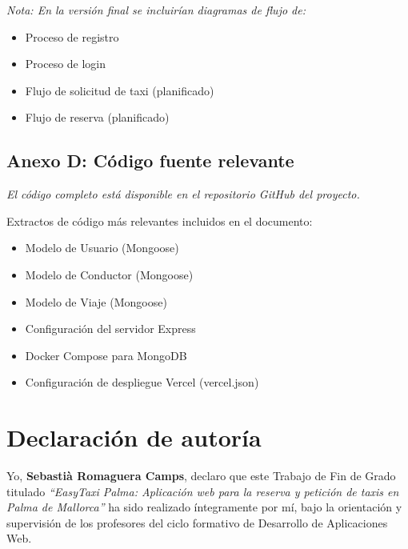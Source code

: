 \documentclass[12pt,a4paper]{article}
\begin{document}
\textit{Nota: En la versión final se incluirían diagramas de flujo de:}
\begin{itemize}
    \item Proceso de registro
    \item Proceso de login
    \item Flujo de solicitud de taxi (planificado)
    \item Flujo de reserva (planificado)
\end{itemize}

\subsection*{Anexo D: Código fuente relevante}

\textit{El código completo está disponible en el repositorio GitHub del proyecto.}

Extractos de código más relevantes incluidos en el documento:
\begin{itemize}
    \item Modelo de Usuario (Mongoose)
    \item Modelo de Conductor (Mongoose)
    \item Modelo de Viaje (Mongoose)
    \item Configuración del servidor Express
    \item Docker Compose para MongoDB
    \item Configuración de despliegue Vercel (vercel.json)
\end{itemize}

\newpage

\section*{Declaración de autoría}

\vspace{1cm}

Yo, \textbf{Sebastià Romaguera Camps}, declaro que este Trabajo de Fin de Grado titulado \textit{``EasyTaxi Palma: Aplicación web para la reserva y petición de taxis en Palma de Mallorca''} ha sido realizado íntegramente por mí, bajo la orientación y supervisión de los profesores del ciclo formativo de Desarrollo de Aplicaciones Web.
\end{document}
